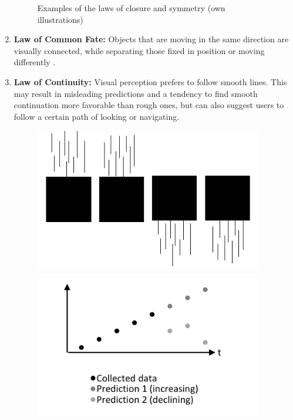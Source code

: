 \begin{enumerate}
\begin{figure}[H]
\begin{minipage}[b]{.5\linewidth}
            \label{fig:sym}
        \end{minipage}
        \caption[Laws of Closure and Symmetry]{Examples of the laws of closure and symmetry (own illustrations)}\label{fig:law2}
    \end{figure}
    \item \textbf{Law of Common Fate:} Objects that are moving in the same direction are visually connected, while separating those fixed in position or moving differently \parencite{Todorovic.2008}.
    \item \textbf{Law of Continuity:} Visual perception prefers to follow smooth lines. This may result in misleading predictions and a tendency to find smooth continuation more favorable than rough ones, but can also suggest users to follow a certain path of looking or navigating. \parencites{Bakar.2017}{Todorovic.2008}
    \begin{figure}[H] 
        \begin{minipage}[b]{.5\linewidth}
            \centering\includegraphics[width=0.94\textwidth]{img/fate.pdf}
            \label{fig:fate}
        \end{minipage}%
        \begin{minipage}[b]{.5\linewidth}
            \centering\includegraphics[width=0.94\textwidth]{img/continuity.pdf}

\end{minipage}
\end{figure}
\end{enumerate}
